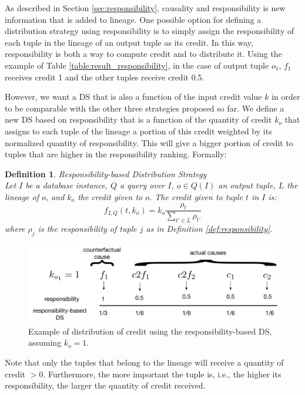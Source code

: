 \documentclass[preprint,12pt,sort&compress]{elsarticle}
\newtheorem{definition}{Definition}[section]
\begin{document}
As described in Section \ref{sec:responsibility}, causality and responsibility is 
new information that is added to lineage.   One possible option for defining a distribution strategy using responsibility is to simply assign the responsibility of each tuple in the lineage of an output tuple as its credit. In this way, responsibility is both a way to compute credit and to distribute it.
Using the example of Table \ref{table:result_responsibility}, in the case of output tuple $o_1$, $f_1$ receives credit 1 and the other tuples receive credit 0.5.


However, we want a DS that is also a function of the input credit value $k$ in order to be comparable with the other three strategies proposed so far.
We define a new DS based on responsibility that is a function of the quantity of credit $k_o$ that assigns to each tuple of the lineage a portion of this credit weighted by its normalized quantity of responsibility.
This will give a bigger portion of credit to tuples that are higher in the responsibility ranking.
Formally:
\newline
\begin{definition}{Responsibility-based Distribution Strategy}\\
\label{def:resp_ds}
Let $I$ be a database instance, $Q$ a query over $I$, $o \in Q(I)$ an output tuple, $L$ the lineage of $o$, and $k_o$ the credit given to $o$. The credit given to tuple $t$ in $I$ is:
\[
	f_{I, Q}(t, k_o) = k_o \frac{\rho_t}{\sum_{t' \in L} \rho_{t'}}
\]
where $\rho_j$ is the responsibility of tuple $j$ as in Definition \ref{def:responsibility}.
\end{definition}


\begin{figure}[]
\centering
  \includegraphics[width=.7\textwidth]{resp_example}
  \caption{Example of distribution of credit using 
    the responsibility-based DS, assuming $k_o = 1$.}
  \label{fig:resp_example}
\end{figure}

Note that only the tuples that belong to the lineage will receive a quantity of credit $> 0$. Furthermore, the more important the tuple is, i.e., the higher its responsibility, the larger the quantity of credit received. 
\end{document}

